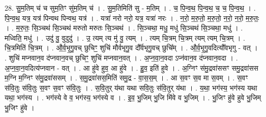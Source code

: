 \documentclass[17pt]{extarticle}
\begin{document}
28. सु॒म॒तिम् च॑ च सुम॒तिꣳ सु॑म॒तिम् च॑ । . सु॒म॒तिमिति॑ सु - म॒तिम् । . च॒ पि॒न्व॒थ॒ पि॒न्व॒थ॒ च॒ च॒ पि॒न्व॒थ॒ । . पि॒न्व॒थ॒ यत्र॒ यत्र॑ पिन्वथ पिन्वथ॒ यत्र॑ । . यत्रा॑ नरो नरो॒ यत्र॒ यत्रा॑ नरः । . न॒रो॒ म॒रु॒तो॒ म॒रु॒तो॒ न॒रो॒ न॒रो॒ म॒रु॒तः॒ । . म॒रु॒तः॒ सि॒ञ्चथ॑ सि॒ञ्चथ॑ मरुतो मरुतः सि॒ञ्चथ॑ । . सि॒ञ्चथा॒ मधु॒ मधु॑ सि॒ञ्चथ॑ सि॒ञ्चथा॒ मधु॑ । . मध्विति॒ मधु॑ । . उदु॑ वु॒ वुदुदु॑ । . उ॒ त्यम् त्य मु॑ वु॒ त्यम् । . त्यम् चि॒त्रम् चि॒त्रम् त्यम् त्यम् चि॒त्रम् । . चि॒त्रमिति॑ चि॒त्रम् । . औ॒र्व॒भृ॒गु॒वच् छुचिꣳ॒॒ शुचि॑ मौर्वभृगु॒व दौ᳚र्वभृगु॒वच् छुचि᳚म् । . औ॒र्व॒भृ॒गु॒वदित्यौ᳚वभृगु - वत् । . शुचि॑ मप्नवान॒व द॑प्नवान॒वच् छुचिꣳ॒॒ शुचि॑ मप्नवान॒वत् । . अ॒प्न॒वा॒न॒वदा ऽप्न॑वान॒व द॑प्नवान॒वदा । . अ॒प्न॒वा॒न॒वदित्य॑प्नवान - वत् । . आ हु॑वे हुव॒ आ हु॑वे । . हु॒व॒ इति॑ हुवे । . अ॒ग्निꣳ स॑मु॒द्रवा॑ससꣳ समु॒द्रवा॑सस म॒ग्नि म॒ग्निꣳ स॑मु॒द्रवा॑ससम् । . स॒मु॒द्रवा॑सस॒मिति॑ समु॒द्र - वा॒स॒स॒म् । . आ स॒वꣳ स॒व मा स॒वम् । . स॒वꣳ स॑वि॒तुः स॑वि॒तुः स॒वꣳ स॒वꣳ स॑वि॒तुः । . स॒वि॒तुर् य॑था यथा सवि॒तुः स॑वि॒तुर् य॑था । . य॒था॒ भग॑स्य॒ भग॑स्य यथा यथा॒ भग॑स्य । . भग॑स्ये वे व॒ भग॑स्य॒ भग॑स्ये व । . इ॒व॒ भु॒जिम् भु॒जि मि॑वे व भु॒जिम् । . भु॒जिꣳ हु॑वे हुवे भु॒जिम् भु॒जिꣳ हु॑वे । \newline
\end{document}
